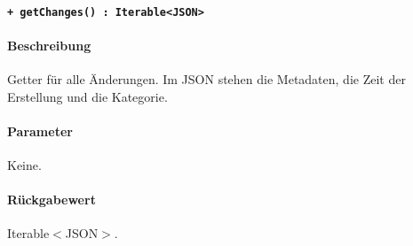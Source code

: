 \paragraph{\texttt{+ getChanges() : Iterable<JSON>}}\label{AP_Framework_getChanges}%
\paragraph*{Beschreibung}
Getter für alle Änderungen.
Im JSON stehen die Metadaten, die Zeit der Erstellung und die Kategorie.
\paragraph*{Parameter}
Keine.
\paragraph*{Rückgabewert}
Iterable$<$JSON$>$.